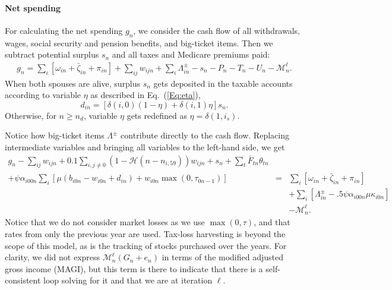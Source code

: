 \documentclass{report}[fleqn,12pt]
\begin{document}
\paragraph*{Net spending}
	For calculating the net spending $g_n$, we consider the cash flow of all withdrawals,
	wages, social security and pension benefits, and big-ticket items. 
	Then we subtract potential surplus $s_{n}$ and all taxes and Medicare premiums paid:
	\begin{eqnarray}
		g_n = \sum_i [\omega_{in} + \bar{\zeta}_{in} + \pi_{in} ] 
		+ \sum_{ij} w_{ijn} + \sum_i \Lambda^\pm_{in} - s_{n}
		- P_n - T_n - U_n - \mathcal{M}^\ell_n.
	\end{eqnarray}
	When both spouses are alive, surplus $s_n$ gets deposited in the taxable accounts
	according to variable $\eta$ as described in Eq.~(\ref{Eq:eta}),
	\begin{equation}
		\label{Eq:eta2}
		d_{in} = [\delta(i, 0)(1 - \eta) + \delta(i, 1)\eta] s_n .
	\end{equation}
	Otherwise, for $n \ge n_d$, variable $\eta$ gets redefined as $\eta = \delta(1, i_s)$.

	Notice how big-ticket items $\Lambda^\pm$ contribute directly to the cash flow.
	Replacing intermediate variables and bringing all variables to the left-hand side, we get
	\begin{eqnarray}
		\label{Eq:C4}
		g_n - \sum_{ij} w_{ijn} + 0.1 \sum_{i,j\neq0} (1-\mathcal{H}(n - n_{i, 59})) w_{ijn} + s_n
		+ \sum_t \bar{F}_{tn} \theta_{t n} &&\nonumber \\
		+ \psi\alpha_{i00n} \sum_{i} \left[\mu(b_{i0n} - w_{i0n} + d_{in})
		+ w_{i0n}\max(0, \tau_{0n-1})\right] 
		&=& \sum_i [\omega_{in} + \bar{\zeta}_{in} + \pi_{in} ] \nonumber\\
		&& + \sum_i [\Lambda^\pm_{in} - .5\psi\alpha_{i00n}\mu\kappa_{i0n}] \nonumber\\
		&& - \mathcal{M}_n^\ell.
	\end{eqnarray}
	Notice that we do not consider market losses as we use $\max(0, \tau)$, and that
	rates from only the previous year are used. Tax-loss
	harvesting is beyond the scope of this model, as is the tracking of stocks
	purchased over the years.
	For clarity, we did not express $\mathcal{M}_n^\ell(G_n+e_n)$ in terms of the modified
	adjusted gross income (MAGI), but this term is there to indicate that there is a self-consistent
	loop solving for it and that we are at iteration $\ell$.
\end{document}
